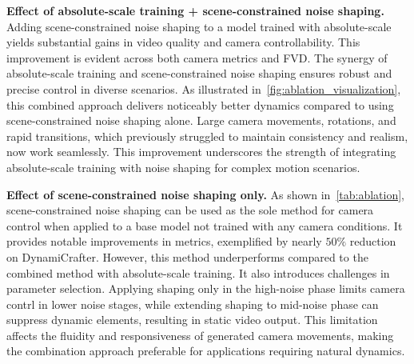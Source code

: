 \noindent\textbf{Effect of absolute-scale training + scene-constrained noise shaping.}
Adding scene-constrained noise shaping to a model trained with absolute-scale yields substantial gains in video quality and camera controllability.
This improvement is evident across both camera metrics and FVD. %
The synergy of absolute-scale training and scene-constrained noise shaping ensures robust and precise control in diverse scenarios.
As illustrated in~\cref{fig:ablation_visualization}, this combined approach delivers noticeably better dynamics compared to using scene-constrained noise shaping alone. 
Large camera movements, rotations, and rapid transitions, which previously struggled to maintain consistency and realism, now work seamlessly. 
This improvement underscores the strength of integrating absolute-scale training with noise shaping for complex motion scenarios.











\noindent\textbf{Effect of scene-constrained noise shaping only.}
As shown in~\cref{tab:ablation}, scene-constrained noise shaping can be used as the sole method for camera control when applied to a base model not trained with any camera conditions.
It provides notable improvements in metrics, exemplified by nearly \(50\%\) reduction on DynamiCrafter. 
However, this method underperforms compared to the combined method with absolute-scale training.
It also introduces challenges in parameter selection. 
Applying shaping only in the high-noise phase limits camera contrl in lower noise stages, while extending shaping to mid-noise phase can suppress dynamic elements, resulting in static video output.
This limitation affects the fluidity and responsiveness of generated camera movements, making the combination approach preferable for applications requiring natural dynamics.

